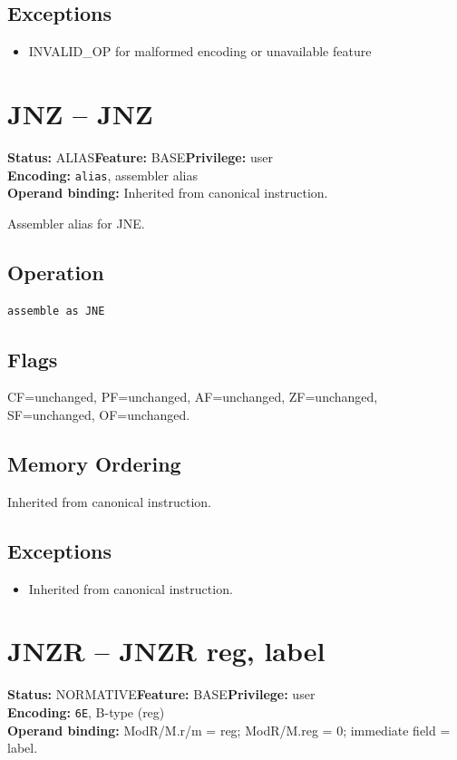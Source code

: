 \documentclass[10pt]{article}
\begin{document}
\subsection*{Exceptions}
\begin{itemize}
\item INVALID\_OP for malformed encoding or unavailable feature
\end{itemize}
\clearpage

\section{JNZ -- JNZ}
\textbf{Status:} ALIAS\quad \textbf{Feature:} BASE\quad \textbf{Privilege:} user\\
\textbf{Encoding:} \texttt{alias}, assembler alias\\
\textbf{Operand binding:} Inherited from canonical instruction.

Assembler alias for JNE.

\subsection*{Operation}
\begin{lstlisting}
assemble as JNE
\end{lstlisting}
\subsection*{Flags}
CF=unchanged, PF=unchanged, AF=unchanged, ZF=unchanged, SF=unchanged, OF=unchanged.
\subsection*{Memory Ordering}
Inherited from canonical instruction.
\subsection*{Exceptions}
\begin{itemize}
\item Inherited from canonical instruction.
\end{itemize}
\clearpage

\section{JNZR -- JNZR reg, label}
\textbf{Status:} NORMATIVE\quad \textbf{Feature:} BASE\quad \textbf{Privilege:} user\\
\textbf{Encoding:} \texttt{6E}, B-type (reg)\\
\textbf{Operand binding:} ModR/M.r/m = reg; ModR/M.reg = 0; immediate field = label.
\end{document}
